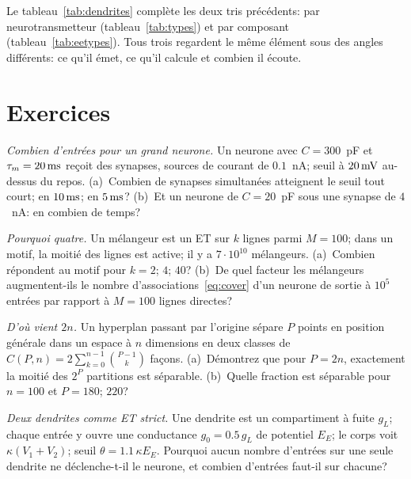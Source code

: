 Le tableau~\ref{tab:dendrites} complète les deux tris précédents: par neurotransmetteur (tableau~\ref{tab:types}) et par composant (tableau~\ref{tab:eetypes}). Tous trois regardent le même élément sous des angles différents: ce qu'il émet, ce qu'il calcule et combien il écoute.

\section{Exercices}

\begin{exercise}[\lvlA]
\label{ex:19:1}
\emph{Combien d'entrées pour un grand neurone.} Un neurone avec $C=300$~pF et $\tau_m=20\,\text{ms}$ reçoit des synapses, sources de courant de $0.1$~nA; seuil à $20\,\text{mV}$ au-dessus du repos. (a)~Combien de synapses simultanées atteignent le seuil tout court; en $10\,\text{ms}$; en $5\,\text{ms}$? (b)~Et un neurone de $C=20$~pF sous une synapse de $4$~nA: en combien de temps?
\end{exercise}

\begin{exercise}[\lvlA]
\label{ex:19:2}
\emph{Pourquoi quatre.} Un mélangeur est un \og ET\fg{} sur $k$ lignes parmi $M=100$; dans un motif, la moitié des lignes est active; il y a $7\cdot10^{10}$ mélangeurs. (a)~Combien répondent au motif pour $k=2$; $4$; $40$? (b)~De quel facteur les mélangeurs augmentent-ils le nombre d'associations~\eqref{eq:cover} d'un neurone de sortie à $10^5$ entrées par rapport à $M=100$ lignes directes?
\end{exercise}

\begin{exercise}[\lvlB]
\label{ex:19:3}
\emph{D'où vient $2n$.} Un hyperplan passant par l'origine sépare $P$ points en position générale dans un espace à $n$ dimensions en deux classes de $C(P,n)=2\sum_{k=0}^{n-1}\binom{P-1}{k}$ façons. (a)~Démontrez que pour $P=2n$, exactement la moitié des $2^P$ partitions est séparable. (b)~Quelle fraction est séparable pour $n=100$ et $P=180$; $220$?
\end{exercise}

\begin{exercise}[\lvlB]
\label{ex:19:4}
\emph{Deux dendrites comme \og ET\fg{} strict.} Une dendrite est un compartiment à fuite $g_L$; chaque entrée y ouvre une conductance $g_0=0.5\,g_L$ de potentiel $E_E$; le corps voit $\kappa(V_1+V_2)$; seuil $\theta=1.1\,\kappa E_E$. Pourquoi aucun nombre d'entrées sur une seule dendrite ne déclenche-t-il le neurone, et combien d'entrées faut-il sur chacune?
\end{exercise}


